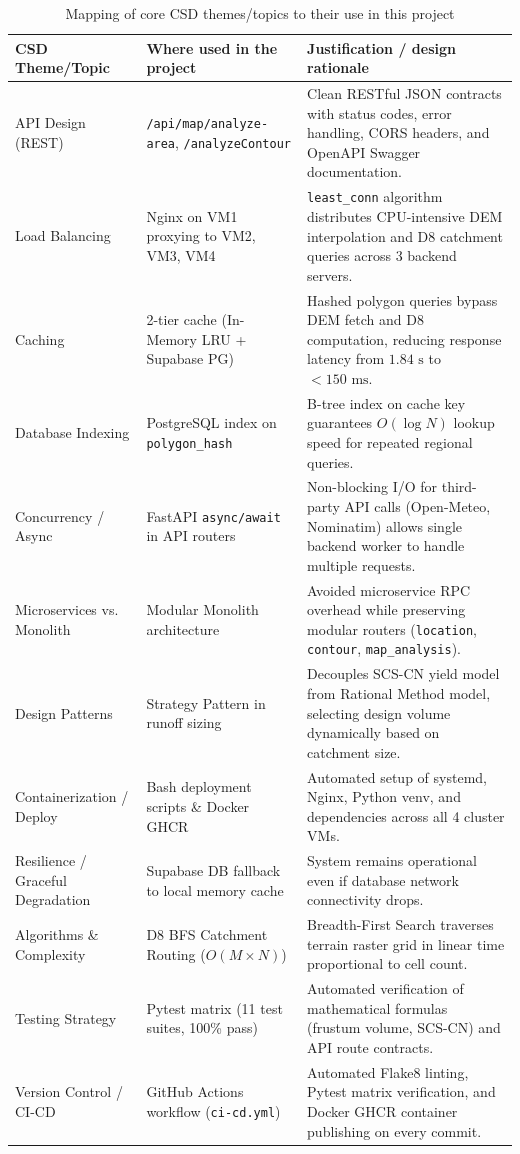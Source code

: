 \documentclass[manuscript,screen]{acmart}
\begin{document}
\begin{table}[t]
  \caption{Mapping of core CSD themes/topics to their use in this project}
  \label{tab:csd-themes}
  \begin{tabular}{p{3.2cm}p{4.8cm}p{7.0cm}}
    \toprule
    CSD Theme/Topic & Where used in the project & Justification / design rationale \\
    \midrule
    API Design (REST) & \texttt{/api/map/analyze-area}, \texttt{/analyzeContour} & Clean RESTful JSON contracts with status codes, error handling, CORS headers, and OpenAPI Swagger documentation. \\
    Load Balancing & Nginx on VM1 proxying to VM2, VM3, VM4 & \texttt{least\_conn} algorithm distributes CPU-intensive DEM interpolation and D8 catchment queries across 3 backend servers. \\
    Caching & 2-tier cache (In-Memory LRU + Supabase PG) & Hashed polygon queries bypass DEM fetch and D8 computation, reducing response latency from $1.84\text{ s}$ to $< 150\text{ ms}$. \\
    Database Indexing & PostgreSQL index on \texttt{polygon\_hash} & B-tree index on cache key guarantees $O(\log N)$ lookup speed for repeated regional queries. \\
    Concurrency / Async & FastAPI \texttt{async/await} in API routers & Non-blocking I/O for third-party API calls (Open-Meteo, Nominatim) allows single backend worker to handle multiple requests. \\
    Microservices vs. Monolith & Modular Monolith architecture & Avoided microservice RPC overhead while preserving modular routers (\texttt{location}, \texttt{contour}, \texttt{map\_analysis}). \\
    Design Patterns & Strategy Pattern in runoff sizing & Decouples SCS-CN yield model from Rational Method model, selecting design volume dynamically based on catchment size. \\
    Containerization / Deploy & Bash deployment scripts \& Docker GHCR & Automated setup of systemd, Nginx, Python venv, and dependencies across all 4 cluster VMs. \\
    Resilience / Graceful Degradation & Supabase DB fallback to local memory cache & System remains operational even if database network connectivity drops. \\
    Algorithms \& Complexity & D8 BFS Catchment Routing ($O(M \times N)$) & Breadth-First Search traverses terrain raster grid in linear time proportional to cell count. \\
    Testing Strategy & Pytest matrix (11 test suites, 100\% pass) & Automated verification of mathematical formulas (frustum volume, SCS-CN) and API route contracts. \\
    Version Control / CI-CD & GitHub Actions workflow (\texttt{ci-cd.yml}) & Automated Flake8 linting, Pytest matrix verification, and Docker GHCR container publishing on every commit. \\
    \bottomrule
  \end{tabular}
\end{table}
\end{document}
